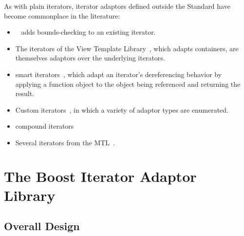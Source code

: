 \documentclass{netobjectdays}
\begin{document}
As with plain iterators, iterator adaptors defined outside the
Standard have become commonplace in the literature:\begin{itemize}

\item {}~\cite{stroustrup00:_cpp_prog_lang} adds
bounds-checking to an existing iterator.

 \item The iterators of the View Template
Library~\cite{TMPW00:Weiser}, which adapts containers, are themselves
adaptors over the underlying iterators.

 \item smart iterators~\cite{becker98:_smart_iterators},
which adapt an iterator's dereferencing behavior by applying a
function object to the object being referenced and returning the
result.

 \item Custom iterators~\cite{TMPW00:Baus},
in which a variety of adaptor types are enumerated.

 \item compound iterators~\cite{alexandrescu98:_compound_iters}

 \item Several iterators from the MTL~\cite{siek99:_scitools}.

\end{itemize}

\section{The Boost Iterator Adaptor Library}



\subsection{Overall Design}
\end{document}
